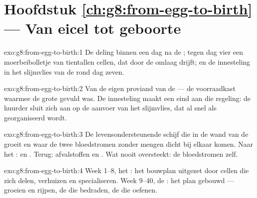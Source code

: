 \section*{Hoofdstuk \ref{ch:g8:from-egg-to-birth} --- Van eicel tot geboorte}

\begin{solution}{exo:g8:from-egg-to-birth:1}
De deling binnen een dag na de ; tegen dag vier een
moerbeibolletje van tientallen cellen, dat door de  omlaag drijft;
en de innesteling in het slijmvlies van de  rond dag zeven.
\end{solution}

\begin{solution}{exo:g8:from-egg-to-birth:2}
Van de eigen proviand van de  --- de voorraadkast waarmee de grote
 gevuld was. De innesteling maakt een eind aan die regeling: de
huurder sluit zich aan op de aanvoer van het slijmvlies, dat al snel als
 georganiseerd wordt.
\end{solution}

\begin{solution}{exo:g8:from-egg-to-birth:3}
De levensondersteunende schijf die in de wand van de  groeit en
waar de twee bloedstromen zonder mengen dicht bij elkaar komen. Naar het
:  en . Terug: afvalstoffen en
. Wat nooit oversteekt: de bloedstromen zelf.
\end{solution}

\begin{solution}{exo:g8:from-egg-to-birth:4}
Week 1--8, het : het bouwplan uitgezet door cellen die zich delen,
verhuizen en specialiseren. Week 9--40, de : het plan gebouwd ---
groeien en rijpen, de  die bedraden, de  die oefenen.
\end{solution}

